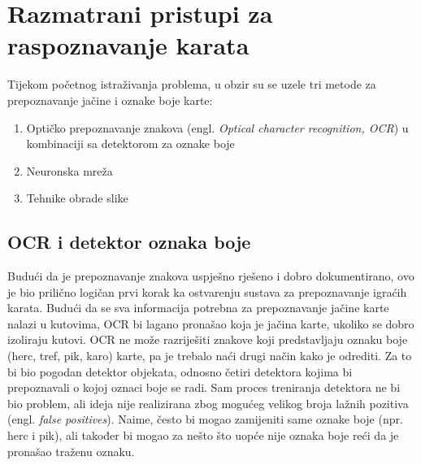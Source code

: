 \documentclass[times, zavrsni, numeric, utf8]{fer}
\begin{document}
\chapter{Razmatrani pristupi za raspoznavanje karata}
\label{chap:methods}
\hspace*{0.5cm}Tijekom početnog istraživanja problema, u obzir su se uzele tri metode za prepoznavanje jačine i oznake boje karte:
\begin{enumerate}
\item Optičko prepoznavanje znakova (engl. \textit{Optical character recognition, OCR}) u kombinaciji sa detektorom za oznake boje
\item Neuronska mreža
\item Tehnike obrade slike
\end{enumerate}

\section{OCR i detektor oznaka boje}
\hspace*{0.5cm}Budući da je prepoznavanje znakova uspješno rješeno i dobro dokumentirano, ovo je bio prilično logičan prvi korak ka ostvarenju sustava za prepoznavanje igraćih karata. Budući da se sva informacija potrebna za prepoznavanje jačine karte nalazi u kutovima, OCR bi lagano pronašao koja je jačina karte, ukoliko se dobro izoliraju kutovi. OCR ne može razriješiti znakove koji predstavljaju oznaku boje (herc, tref, pik, karo) karte, pa je trebalo naći drugi način kako je odrediti. Za to bi bio pogodan detektor objekata, odnosno četiri detektora kojima bi prepoznavali o kojoj oznaci boje se radi. Sam proces treniranja detektora ne bi bio problem, ali ideja nije realizirana zbog mogućeg velikog broja lažnih pozitiva (engl. \textit{false positives}). Naime, često bi mogao zamijeniti same oznake boje (npr. herc i pik), ali također bi mogao za nešto što uopće nije oznaka boje reći da je pronašao traženu oznaku. 
\end{document}
